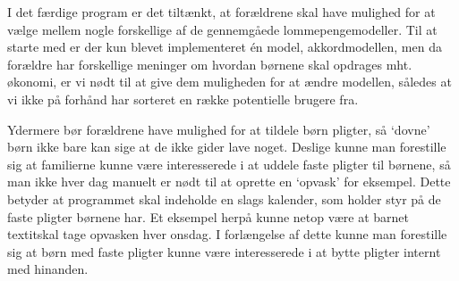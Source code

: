 I det færdige program er det tiltænkt, at forældrene skal have mulighed for at vælge mellem nogle forskellige af de gennemgåede lommepengemodeller. Til at starte med er der kun blevet implementeret én model, akkordmodellen, men da forældre har forskellige meninger om hvordan børnene skal opdrages mht. økonomi, er vi nødt til at give dem muligheden for at ændre modellen, således at vi ikke på forhånd har sorteret en række potentielle brugere fra.

Ydermere bør forældrene have mulighed for at tildele børn pligter, så ‘dovne’ børn ikke bare kan sige at de ikke gider lave noget. Deslige kunne man forestille sig at familierne kunne være interesserede i at uddele faste pligter til børnene, så man ikke hver dag manuelt er nødt til at oprette en ‘opvask’ for eksempel. Dette betyder at programmet skal indeholde en slags kalender, som holder styr på de faste pligter børnene har. Et eksempel herpå kunne netop være at barnet textit{skal} tage opvasken hver onsdag. I forlængelse af dette kunne man forestille sig at børn med faste pligter kunne være interesserede i at bytte pligter internt med hinanden.